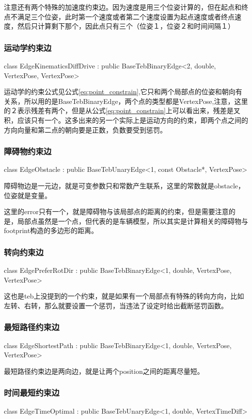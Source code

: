 \documentclass[10pt,a4paper]{article}
\theoremstyle{mythm}
\numberwithin{equation}{section}
\begin{document}
注意还有两个特殊的加速度约束边。因为速度是用三个位姿计算的，但在起点和终点不满足三个位姿，此时第一个速度或者第二个速度设置为起点速度或者终点速度，然后只计算剩下那个，因此点只有三个（位姿１，位姿２和时间间隔１）

\subsubsection{运动学约束边}
class EdgeKinematicsDiffDrive : public BaseTebBinaryEdge<2, double, VertexPose, VertexPose>

运动学的约束公式见公式\ref{eq:point_constrain},它只和两个局部点的位姿和朝向有关系，所以用的是BaseTebBinaryEdge，两个点的类型都是VertexPose,注意，这里的２表示残差有两个，但是从公式\ref{eq:point_constrain}上可以看出来，残差是叉积，应该只有一个。这多出来的另一个实际上是运动方向的约束，即两个点之间的方向向量和第二点的朝向要是正数，负数要受到惩罚。

\subsubsection{障碍物约束边}
class EdgeObstacle : public BaseTebUnaryEdge<1, const Obstacle*, VertexPose>

障碍物边是一元边，就是可变参数只和常数产生联系，这里的常数就是obstacle，位姿就是变量。

这里的error只有一个，就是障碍物与该局部点的距离的约束，但是需要注意的是，局部点虽然是一个点，但代表的是车辆模型，所以其实是计算相关的障碍物与footprint构造的多边形的距离。
\subsubsection{转向约束边}
class EdgePreferRotDir : public BaseTebBinaryEdge<1, double, VertexPose, VertexPose>

这也是teb上没提到的一个约束，就是如果有一个局部点有特殊的转向方向，比如左转、右转，那么就要设置一个惩罚，当违法了设定时给出截断惩罚函数。

\subsubsection{最短路径约束边}
class EdgeShortestPath : public BaseTebBinaryEdge<1, double, VertexPose, VertexPose>

最短路径约束边是两向边，就是让两个position之间的距离尽量短。

\subsubsection{时间最短约束边}
class EdgeTimeOptimal : public BaseTebUnaryEdge<1, double, VertexTimeDiff>
\end{document}
